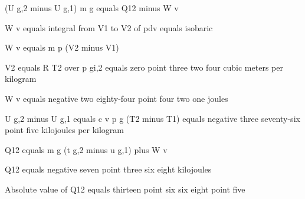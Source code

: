 (U g,2 minus U g,1) m g equals Q12 minus W v

W v equals integral from V1 to V2 of pdv equals isobaric

W v equals m p (V2 minus V1)

V2 equals R T2 over p gi,2 equals zero point three two four cubic meters per kilogram

W v equals negative two eighty-four point four two one joules

U g,2 minus U g,1 equals c v p g (T2 minus T1) equals negative three seventy-six point five kilojoules per kilogram

Q12 equals m g (t g,2 minus u g,1) plus W v

Q12 equals negative seven point three six eight kilojoules

Absolute value of Q12 equals thirteen point six six eight point five